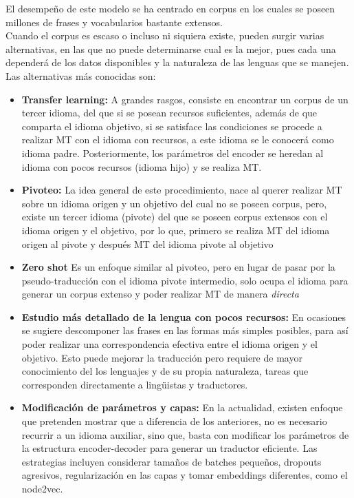 \documentclass[12pt, letterpaper]{article}
\begin{document}
El desempeño de este modelo se ha centrado en corpus en los cuales se poseen millones de frases y vocabularios bastante extensos.\\

Cuando el corpus es escaso o incluso ni siquiera existe, pueden surgir varias alternativas, en las que no puede determinarse cual es la mejor, pues cada una dependerá de los datos disponibles y la naturaleza de las lenguas que se manejen.\\

Las alternativas más conocidas son:

\begin{itemize}
\item \textbf{Transfer learning:} A grandes rasgos, consiste en encontrar un corpus de un tercer idioma, del que si se posean recursos suficientes, además de que comparta el idioma objetivo, si se satisface las condiciones se procede a realizar MT con el idioma con recursos, a este idioma se le conocerá como idioma padre. Posteriormente, los parámetros del encoder se heredan al idioma con pocos recursos (idioma hijo) y se realiza MT.
\item \textbf{Pivoteo:} La idea general de este procedimiento, nace al querer realizar MT sobre un idioma origen y un objetivo del cual no se poseen corpus, pero, existe un tercer idioma (pivote) del que se poseen corpus extensos con el idioma origen y el objetivo, por lo que, primero se realiza MT del idioma origen al pivote y después MT del idioma pivote al objetivo
\item \textbf{Zero shot} Es un enfoque similar al pivoteo, pero en lugar de pasar por la pseudo-traducción con el idioma pivote intermedio, solo ocupa el idioma para generar un corpus extenso y poder realizar MT de manera \emph{directa}
\item \textbf{Estudio más detallado de la lengua con pocos recursos:} En ocasiones se sugiere descomponer las frases en las formas más simples posibles, para así poder realizar una correspondencia efectiva entre el idioma origen y el objetivo. Esto puede mejorar la traducción pero requiere de mayor conocimiento del los lenguajes y de su propia naturaleza, tareas que corresponden directamente a lingüistas y traductores. 
\item \textbf{Modificación de parámetros y capas:} En la actualidad, existen enfoque que pretenden mostrar que a diferencia de los anteriores, no es necesario recurrir a un idioma auxiliar, sino que, basta con modificar los parámetros de la estructura encoder-decoder para generar un traductor eficiente. Las estrategias incluyen considerar tamaños de batches pequeños, dropouts agresivos, regularización en las capas y tomar embeddings diferentes, como el node2vec.
\end{itemize}
\end{document}
